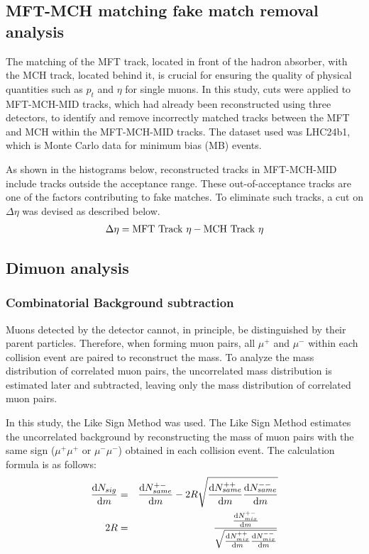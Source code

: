     \subsection{MFT-MCH matching fake match removal analysis}
        The matching of the MFT track, located in front of the hadron absorber, with the MCH track, located behind it, is crucial for ensuring the quality of physical quantities such as \( p_t \) and \(\eta\) for single muons. In this study, cuts were applied to MFT-MCH-MID tracks, which had already been reconstructed using three detectors, to identify and remove incorrectly matched tracks between the MFT and MCH within the MFT-MCH-MID tracks.
        The dataset used was LHC24b1, which is Monte Carlo data for minimum bias (MB) events. 
        \begin{figure}
            
        \end{figure}
        As shown in the histograms below, reconstructed tracks in MFT-MCH-MID include tracks outside the acceptance range. These out-of-acceptance tracks are one of the factors contributing to fake matches. To eliminate such tracks, a cut on \(\Delta \eta\) was devised as described below.
            \begin{eqnarray}
                \Delta \eta = \rm{MFT\ Track\ } \eta - \rm{MCH\ Track\ } \eta  
            \end{eqnarray}
    
    \subsection{Dimuon analysis}
        \subsubsection{Combinatorial Background subtraction}
            \label{Analysis:Dimuon Analysis:Combinatorial BG subtraction}
            Muons detected by the detector cannot, in principle, be distinguished by their parent particles. Therefore, when forming muon pairs, all \(\mu^+\) and \(\mu^-\) within each collision event are paired to reconstruct the mass. To analyze the mass distribution of correlated muon pairs, the uncorrelated mass distribution is estimated later and subtracted, leaving only the mass distribution of correlated muon pairs.

            In this study, the Like Sign Method was used. The Like Sign Method estimates the uncorrelated background by reconstructing the mass of muon pairs with the same sign (\(\mu^+\mu^+\) or \(\mu^-\mu^-\)) obtained in each collision event. The calculation formula is as follows: 
            \begin{eqnarray}
                \dv{N_{sig}}{m} &=& \dv{N_{same}^{+-}}{m} -2R\sqrt{\dv{N_{same}^{++}}{m} \dv{N_{same}^{--}}{m}}\\
                2R&=&\frac{\dv{N_{mix}^{+-}}{m}}{\sqrt{\dv{N_{mix}^{++}}{m} \dv{N_{mix}^{--}}{m}}} 
            \end{eqnarray}

